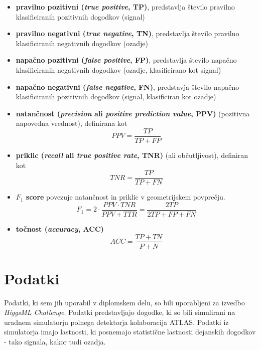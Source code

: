 \documentclass[11pt,a4paper,openany]{book}
\begin{document}
\begin{itemize}
	\item \textbf{pravilno pozitivni (\textit{true positive}, TP)}, predstavlja število pravilno klasificiranih pozitivnih dogodkov (signal)
	\item \textbf{pravilno negativni (\textit{true negative}, TN)}, predstavlja število pravilno klasificiranih negativnih dogodkov (ozadje)
	\item \textbf{napačno pozitivni (\textit{false positive}, FP)}, predstavlja število napačno klasificiranih negativnih dogodkov (ozadje, klasificirano kot signal)
	\item \textbf{napačno negativni (\textit{false negative}, FN)}, predstavja število napačno klasificiranih pozitivnih dogodkov (signal, klasificiran kot ozadje)
	\item \textbf{natančnost (\textit{precision} ali \textit{positive prediction value}, PPV)} (pozitivna napovedna vrednost), definirana kot 
	\begin{equation}	
	PPV = \frac{TP}{TP + FP}
	\end{equation}
	\item \textbf{priklic (\textit{recall} ali \textit{true positive rate}, TNR)} (ali občutljivost), definiran kot
	\begin{equation}	
	TNR = \frac{TP}{TP + FN}
	\end{equation}
	\item \textbf{$F_1$ score} povezuje natančnost in priklic v geometrijskem povprečju. 
	\begin{equation}
	F_1 = 2 \cdot \frac{PPV \cdot TNR}{PPV + TTR} = \frac{2TP}{2TP + FP + FN}
	\end{equation}
	\item \textbf{točnost (\textit{accuracy}, ACC)}
	\begin{equation}
	ACC = \frac{TP + TN}{P + N}
	\end{equation}
\end{itemize}



\chapter{Podatki}
\label{analiza-podatkov}
Podatki, ki sem jih uporabil v diplomskem delu, so bili uporabljeni za izvedbo \textit{HiggsML Challenge}. Podatki predstavljajo dogodke, ki so bili simulirani na uradnem simulatorju polnega detektorja kolaboracija ATLAS\cite{Adam-Bourdarios14}. Podatki iz simulatorja imajo lastnosti, ki posnemajo statistične lastnosti dejanskih dogodkov - tako signala, kakor tudi ozadja.
\end{document}
